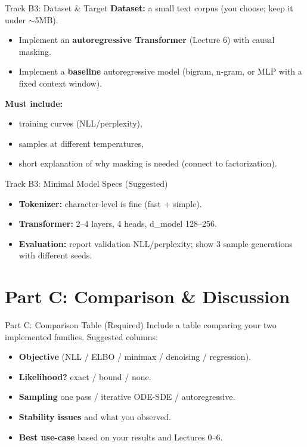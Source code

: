 \documentclass[aspectratio=169]{beamer}
\begin{document}
\begin{frame}{Track B3: Dataset \& Target}
\small
\textbf{Dataset:} a small text corpus (you choose; keep it under $\sim$5MB).
\begin{itemize}
  \item Implement an \textbf{autoregressive Transformer} (Lecture 6) with causal masking.
  \item Implement a \textbf{baseline} autoregressive model (bigram, n-gram, or MLP with a fixed context window).
\end{itemize}
\vspace{0.4em}
\textbf{Must include:}
\begin{itemize}
  \item training curves (NLL/perplexity),
  \item samples at different temperatures,
  \item short explanation of why masking is needed (connect to factorization).
\end{itemize}
\end{frame}

\begin{frame}{Track B3: Minimal Model Specs (Suggested)}
\small
\begin{itemize}
  \item \textbf{Tokenizer:} character-level is fine (fast + simple).
  \item \textbf{Transformer:} 2--4 layers, 4 heads, d\_model 128--256.
  \item \textbf{Evaluation:} report validation NLL/perplexity; show 3 sample generations with different seeds.
\end{itemize}
\end{frame}

\section{Part C: Comparison \& Discussion}

\begin{frame}{Part C: Comparison Table (Required)}
\small
Include a table comparing your two implemented families. Suggested columns:
\begin{itemize}
  \item \textbf{Objective} (NLL / ELBO / minimax / denoising / regression).
  \item \textbf{Likelihood?} exact / bound / none.
  \item \textbf{Sampling} one pass / iterative ODE-SDE / autoregressive.
  \item \textbf{Stability issues} and what you observed.
  \item \textbf{Best use-case} based on your results and Lectures 0--6.
\end{itemize}
\end{frame}
\end{document}
